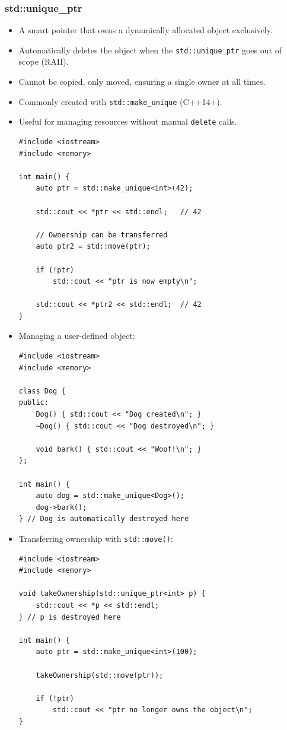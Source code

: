 \documentclass[10pt]{article}
\begin{document}
\subsubsection{std::unique\_ptr}
\begin{itemize}
    \item A smart pointer that owns a dynamically allocated object exclusively.
    \item Automatically deletes the object when the \texttt{std::unique\_ptr} goes out of scope (RAII).
    \item Cannot be copied, only moved, ensuring a single owner at all times.
    \item Commonly created with \texttt{std::make\_unique} (C++14+).
    \item Useful for managing resources without manual \texttt{delete} calls.

    \begin{verbatim}
#include <iostream>
#include <memory>

int main() {
    auto ptr = std::make_unique<int>(42);

    std::cout << *ptr << std::endl;   // 42

    // Ownership can be transferred
    auto ptr2 = std::move(ptr);

    if (!ptr)
        std::cout << "ptr is now empty\n";

    std::cout << *ptr2 << std::endl;  // 42
}
    \end{verbatim}

    \item Managing a user-defined object:

    \begin{verbatim}
#include <iostream>
#include <memory>

class Dog {
public:
    Dog() { std::cout << "Dog created\n"; }
    ~Dog() { std::cout << "Dog destroyed\n"; }

    void bark() { std::cout << "Woof!\n"; }
};

int main() {
    auto dog = std::make_unique<Dog>();
    dog->bark();
} // Dog is automatically destroyed here
    \end{verbatim}

	\item Transferring ownership with \texttt{std::move()}:

\begin{verbatim}
#include <iostream>
#include <memory>

void takeOwnership(std::unique_ptr<int> p) {
    std::cout << *p << std::endl;
} // p is destroyed here

int main() {
    auto ptr = std::make_unique<int>(100);

    takeOwnership(std::move(ptr));

    if (!ptr)
        std::cout << "ptr no longer owns the object\n";
}
\end{verbatim}
\end{itemize}
\end{document}
